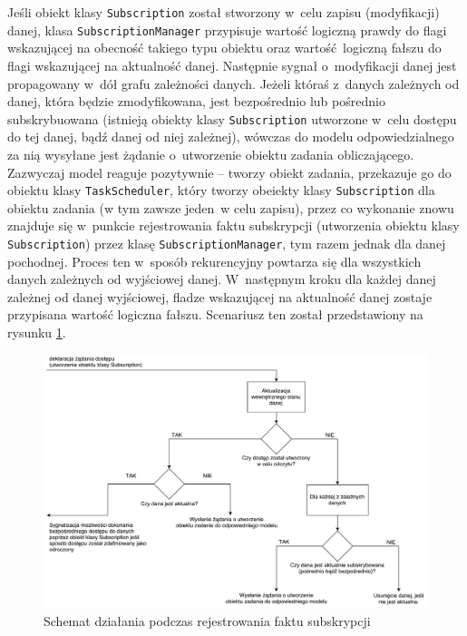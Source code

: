 Jeśli obiekt klasy \lstinline$Subscription$ został stworzony w~celu zapisu (modyfikacji) danej, klasa \lstinline$SubscriptionManager$ przypisuje wartość logiczną prawdy do flagi wskazującej na obecność takiego typu obiektu oraz wartość logiczną fałszu do flagi wskazującej na aktualność danej. Następnie sygnał o~modyfikacji danej jest propagowany w~dół grafu zależności danych. Jeżeli któraś z~danych zależnych od danej, która będzie zmodyfikowana, jest bezpośrednio lub pośrednio subskrybuowana (istnieją obiekty klasy \lstinline$Subscription$ utworzone w~celu dostępu do tej danej, bądź danej od niej zależnej), wówczas do modelu odpowiedzialnego za nią wysyłane jest żądanie o~utworzenie obiektu zadania obliczającego. Zazwyczaj model reaguje pozytywnie -- tworzy obiekt zadania, przekazuje go do obiektu klasy \lstinline$TaskScheduler$, który tworzy obeiekty klasy \lstinline$Subscription$ dla obiektu zadania (w tym zawsze jeden w celu zapisu), przez co wykonanie znowu znajduje się w~punkcie rejestrowania faktu subskrypcji (utworzenia obiektu klasy \lstinline$Subscription$) przez klasę \lstinline$SubscriptionManager$, tym razem jednak dla danej pochodnej. Proces ten w~sposób rekurencyjny powtarza się dla wszystkich danych zależnych od wyjściowej danej. W~następnym kroku dla każdej danej zależnej od danej wyjściowej, fladze wskazującej na aktualność danej zostaje przypisana wartość logiczna fałszu. Scenariusz ten został przedstawiony na rysunku \ref{fig:subscribe}.

\begin{figure}[ht]
	\centering
	\includegraphics[width=1\linewidth]{rys05/subscribe}
	\caption{Schemat działania podczas rejestrowania faktu subskrypcji}
	\label{fig:subscribe}	
\end{figure}

